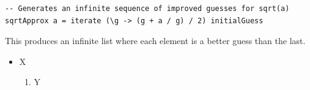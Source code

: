 \documentclass[12pt]{article}
\begin{document}
\begin{verbatim}
-- Generates an infinite sequence of improved guesses for sqrt(a)
sqrtApprox a = iterate (\g -> (g + a / g) / 2) initialGuess
\end{verbatim}

This produces an infinite list where each element is a better guess than the last.


\begin{itemize}
    \item X
          \begin{enumerate}
              \item Y
          \end{enumerate}
\end{itemize}
\end{document}
